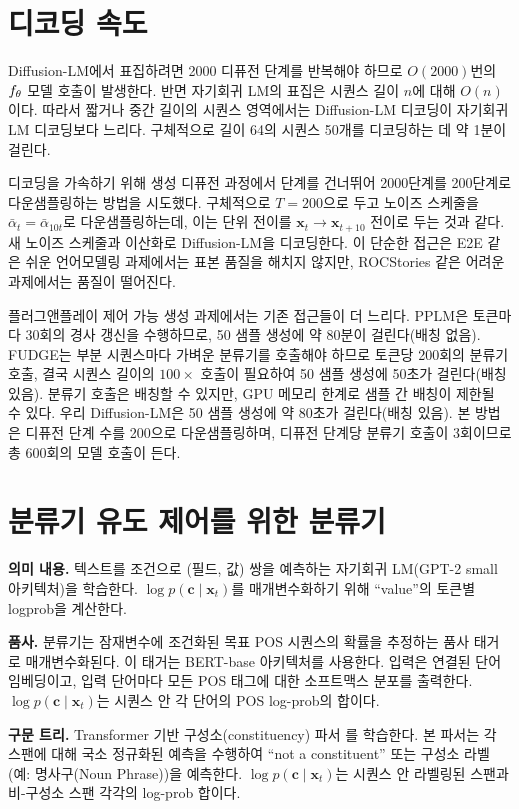 \documentclass{article}
\newcommand{\expmb}[1]{\mathbf{#1}}
\newcommand{\alphabar}{\bar{\alpha}}
\newcommand{\cc}{\expmb{c}}
\newcommand{\cx}[1]{\mathbf{x}_{#1}}
\begin{document}
\section{디코딩 속도}
Diffusion-LM에서 표집하려면 2000 디퓨전 단계를 반복해야 하므로 $O(2000)$번의 $f_\theta$ 모델 호출이 발생한다. 반면 자기회귀 LM의 표집은 시퀀스 길이 $n$에 대해 $O(n)$이다. 따라서 짧거나 중간 길이의 시퀀스 영역에서는 Diffusion-LM 디코딩이 자기회귀 LM 디코딩보다 느리다. 구체적으로 길이 64의 시퀀스 50개를 디코딩하는 데 약 1분이 걸린다.

디코딩을 가속하기 위해 생성 디퓨전 과정에서 단계를 건너뛰어 2000단계를 200단계로 다운샘플링하는 방법을 시도했다. 구체적으로 $T=200$으로 두고 노이즈 스케줄을 $\alphabar_{t} = \alphabar_{10t}$로 다운샘플링하는데, 이는 단위 전이를 $\cx{t} \rightarrow \cx{t+10}$ 전이로 두는 것과 같다. 새 노이즈 스케줄과 이산화로 Diffusion-LM을 디코딩한다. 이 단순한 접근은 E2E 같은 쉬운 언어모델링 과제에서는 표본 품질을 해치지 않지만, ROCStories 같은 어려운 과제에서는 품질이 떨어진다.

플러그앤플레이 제어 가능 생성 과제에서는 기존 접근들이 더 느리다.
PPLM은 토큰마다 30회의 경사 갱신을 수행하므로, 50 샘플 생성에 약 80분이 걸린다(배칭 없음).
FUDGE는 부분 시퀀스마다 가벼운 분류기를 호출해야 하므로 토큰당 200회의 분류기 호출, 결국 시퀀스 길이의 $100\times$ 호출이 필요하여 50 샘플 생성에 50초가 걸린다(배칭 있음). 분류기 호출은 배칭할 수 있지만, GPU 메모리 한계로 샘플 간 배칭이 제한될 수 있다.
우리 Diffusion-LM은 50 샘플 생성에 약 80초가 걸린다(배칭 있음). 본 방법은 디퓨전 단계 수를 200으로 다운샘플링하며, 디퓨전 단계당 분류기 호출이 3회이므로 총 600회의 모델 호출이 든다.

\section{분류기 유도 제어를 위한 분류기}
\textbf{의미 내용.} 텍스트를 조건으로 (필드, 값) 쌍을 예측하는 자기회귀 LM(GPT-2 small 아키텍처)을 학습한다. $\log p(\cc \mid \cx{t})$를 매개변수화하기 위해 ``value''의 토큰별 logprob을 계산한다.


\textbf{품사.} 분류기는 잠재변수에 조건화된 목표 POS 시퀀스의 확률을 추정하는 품사 태거로 매개변수화된다. 이 태거는 BERT-base 아키텍처를 사용한다. 입력은 연결된 단어 임베딩이고, 입력 단어마다 모든 POS 태그에 대한 소프트맥스 분포를 출력한다. $\log p(\cc \mid \cx{t})$는 시퀀스 안 각 단어의 POS log-prob의 합이다.

\textbf{구문 트리.} Transformer 기반 구성소(constituency) 파서 \cite{kitaev-klein-2018-constituency}를 학습한다. 본 파서는 각 스팬에 대해 국소 정규화된 예측을 수행하여 ``not a constituent'' 또는 구성소 라벨(예: 명사구(Noun Phrase))을 예측한다.
$\log p(\cc \mid \cx{t})$는 시퀀스 안 라벨링된 스팬과 비-구성소 스팬 각각의 log-prob 합이다.
\end{document}

